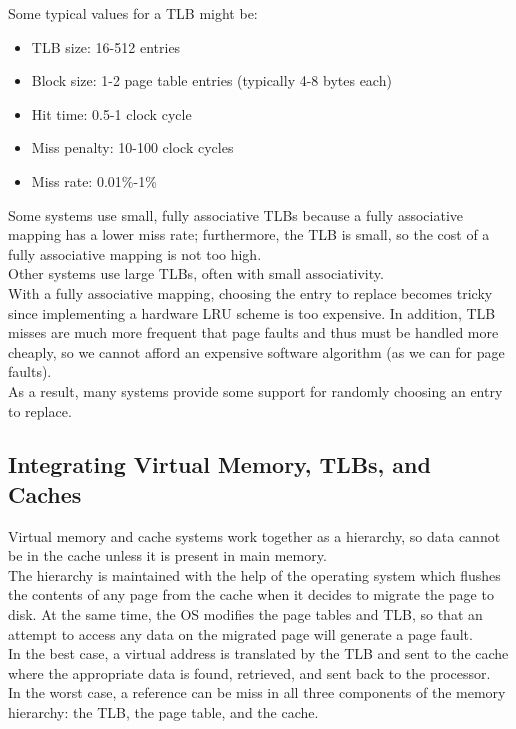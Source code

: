 \documentclass[12pt]{article}
\theoremstyle{definition}
\begin{document}
  Some typical values for a TLB might be:
  \begin{itemize}
    \item TLB size: 16-512 entries
    \item Block size: 1-2 page table entries (typically 4-8 bytes each)
    \item Hit time: 0.5-1 clock cycle
    \item Miss penalty: 10-100 clock cycles
    \item Miss rate: 0.01\%-1\%
  \end{itemize}

  Some systems use small, fully associative TLBs because a fully associative mapping has a lower miss rate;
  furthermore, the TLB is small, so the cost of a fully associative mapping is not too high. \\
  Other systems use large TLBs, often with small associativity. \\
  With a fully associative mapping, choosing the entry to replace becomes tricky since implementing a hardware LRU scheme is too expensive.
  In addition, TLB misses are much more frequent that page faults and thus must be handled more cheaply, so we cannot afford an expensive software algorithm (as we can for page faults). \\
  As a result, many systems provide some support for randomly choosing an entry to replace.

  \subsection{Integrating Virtual Memory, TLBs, and Caches}
  Virtual memory and cache systems work together as a hierarchy, so data cannot be in the cache unless it is present in main memory. \\
  The hierarchy is maintained with the help of the operating system which flushes the contents of any page from the cache when it decides to migrate the page to disk.
  At the same time, the OS modifies the page tables and TLB, so that an attempt to access any data on the migrated page will generate a page fault. \\

  In the best case, a virtual address is translated by the TLB and sent to the cache where the appropriate data is found, retrieved, and sent back to the processor. \\

  In the worst case, a reference can be miss in all three components of the memory hierarchy: the TLB, the page table, and the cache. \\
\end{document}
